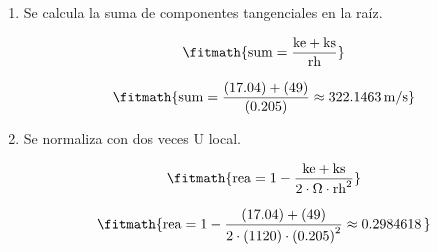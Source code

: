 \begin{enumerate}

\item Se calcula la suma de componentes tangenciales en la raíz.

\[\fitmath{\mathrm{sum}=\frac{\mathrm{ke}+\mathrm{ks}}{\mathrm{rh}}}\]

\[\fitmath{\mathrm{sum}=\frac{(17.04)+(49)}{(0.205)}\approx 322.1463\,\mathrm{m/s}}\]

\item Se normaliza con dos veces U local.

\[\fitmath{\mathrm{rea}=1-\frac{\mathrm{ke}+\mathrm{ks}}{2\cdot \Omega\cdot {\mathrm{rh}}^{2}}}\]

\[\fitmath{\mathrm{rea}=1-\frac{(17.04)+(49)}{2\cdot (1120)\cdot {(0.205)}^{2}}\approx 0.2984618\,}\]

\end{enumerate}
